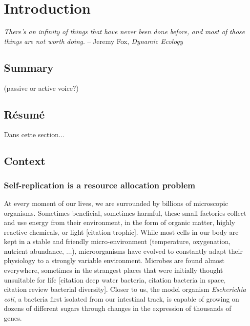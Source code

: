 \chapter{Introduction}

\textit{There's an infinity of things that have never been done before, and most of those things are not worth doing.} -- Jeremy Fox, \textit{Dynamic Ecology}~\cite{fox_how_2016}

\section*{Summary}

(passive or active voice?)


\section*{Résumé}

Dans cette section...

\section{Context}

\subsection{Self-replication is a resource allocation problem}

At every moment of our lives, we are surrounded by billions of microscopic organisms.
Sometimes beneficial, sometimes harmful, these small factories collect and use energy from their environment, in the form of organic matter, highly reactive chemicals, or light [citation trophic].
While most cells in our body are kept in a stable and friendly micro-environment (temperature, oxygenation, nutrient abundance, ...), microorganisms have evolved to constantly adapt their physiology to a strongly variable environment.
Microbes are found almost everywhere, sometimes in the strangest places that were initially thought unsuitable for life [citation deep water bacteria, citation bacteria in space, citation review bacterial diversity].
Closer to us, the model organism \textit{Escherichia coli}, a bacteria first isolated from our intestinal track, is capable of growing on dozens of different sugars through changes in the expression of thousands of genes\cite{zimmer_microcosm:_2009}.

